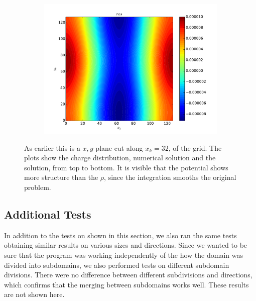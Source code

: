 \begin{figure}
\begin{subfigure}[b]{0.6\textwidth}
			\end{subfigure}
			\begin{subfigure}[b]{0.6\textwidth}
				\includegraphics[width = \textwidth]{figures/verification/analytical/random/residual.pdf}
			\end{subfigure}
			\caption{As earlier this is a \(x,y\)-plane cut along \(x_k=32\), of the grid. The plots show the charge distribution,
			numerical solution and the solution, from top to bottom. It is visible that the potential shows more structure than
			the \(\rho\), since the integration smooths the original problem.}
			\label{fig:random}
		\end{figure}

	\subsection{Additional Tests}
		In addition to the tests on shown in this section, we also ran the same tests
		obtaining similar results on various sizes and directions. Since we wanted to be sure that the program
		was working independently of the how the domain was divided into subdomains, we also performed
		tests on different subdomain divisions. There were no difference between different subdivisions and directions,
		which confirms that the merging between subdomains works well. These results are not shown here.


